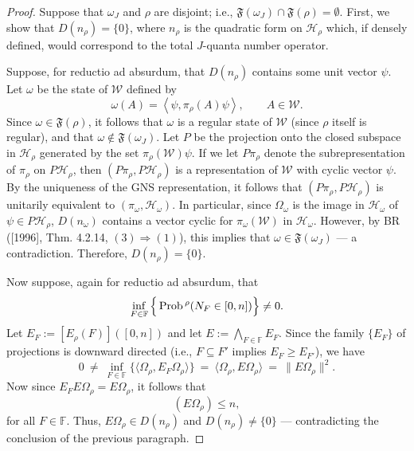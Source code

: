 \documentclass[12pt]{article}
\theoremstyle{remark}
\theoremstyle{definition}
\newcommand{\fin}{\mathbb{F}}
\newcommand{\alg}[1]{\mathcal{#1}}
\newcommand{\norm}[1]{\| #1\|}
\newcommand{\hil}[1]{\mathcal{#1}}
\begin{document}
\begin{proof} Suppose that $\omega _{J}$ and $\rho$ are disjoint; i.e.,
  $\mathfrak{F}(\omega _{J})\cap \mathfrak{F}(\rho)=\emptyset$.  
  First, we show that $D(n_{\rho})=\{0\}$, where $n_{\rho}$ is the 
  quadratic form on $\hil{H}_{\rho}$ which, if densely defined, would 
  correspond to the total 
  $J$-quanta number operator.
  
  Suppose, for reductio ad absurdum, that $D(n_{\rho})$ contains
  some unit vector $\psi$.  Let $\omega$ be the state of $\alg{W}$
  defined by
  \begin{equation} \omega (A)=\left\langle \psi ,\pi
      _{\rho}(A)\psi \right\rangle , \qquad A\in \alg{W}.\end{equation} 
Since $\omega \in \mathfrak{F}(\rho)$, it follows that $\omega$ is 
a regular state of $\alg{W}$
    (since $\rho$ itself is regular), and that $\omega \not\in
    \mathfrak{F}(\omega _{J})$.  Let $P$ be the projection onto the 
    closed subspace in $\hil{H}_{\rho}$ generated by the set 
$\pi _{\rho}(\alg{W})\psi$.  If we
  let $P\pi _{\rho}$ denote the subrepresentation of $\pi _{\rho}$ on
    $P\hil{H}_{\rho}$, then $(P\pi _{\rho},P\hil{H}_{\rho})$ is a
    representation of $\alg{W}$ with
    cyclic vector $\psi$.  By the uniqueness of the GNS
  representation, it follows that $(P\pi _{\rho},P\hil{H}_{\rho})$ is 
  unitarily equivalent to
  $(\pi _{\omega},\hil{H}_{\omega})$.  In particular, since 
  $\Omega_{\omega}$ is the image in $\hil{H}_{\omega}$ of 
  $\psi\in P\hil{H}_{\rho}$, $D(n_{\omega})$ contains a vector cyclic 
  for $\pi _{\omega}(\alg{W})$ in $\hil{H}_{\omega}$.  However, by BR ([1996], Thm. 
  4.2.14, $(3)\Rightarrow (1)$), this implies that 
  $\omega \in \mathfrak{F}(\omega _{J})$ --- a contradiction.  Therefore,
  $D(n_{\rho})=\{ 0\}$. 
  
  Now suppose, again for reductio ad absurdum, that 
  \begin{equation}
  \inf _{F\in \fin} \, \Bigl\{ \,
    \mathrm{Prob}\,^{\rho}(N_{F}\in [0,n]) \Bigr\} \not=0. 
    \end{equation} 
    Let $E_{F}:=[E_{\rho}(F)]([0,n])$ and let $E:=\bigwedge
  _{F\in \mathbb{F}} E_{F}$.  
  Since the family $\{ E_{F} \}$ of projections is downward
  directed (i.e., $F\subseteq F'$ implies $E_{F}\geq E_{F'}$), we have
\begin{equation} 0\:\neq \:\inf _{F\in \fin} \{ \langle \Omega
    _{\rho},E_{F}\Omega _{\rho}\rangle \} \: =\: \langle \Omega
    _{\rho},E\Omega _{\rho}\rangle \: =\: \norm{E\Omega _{\rho}}^{2}
    .\end{equation}
Now since $E_{F}E\Omega _{\rho}=E\Omega
  _{\rho}$, it follows that \begin{equation} [n_{\rho}(F)]
  (E\Omega _{\rho})\leq n ,\end{equation} for all $F\in\fin$.  Thus,
    $E\Omega _{\rho}\in D(n_{\rho})$ and $D(n_{\rho})\neq \{ 0\}$ --- 
    contradicting the conclusion of the previous paragraph.  
\end{proof}
  
\end{document}
